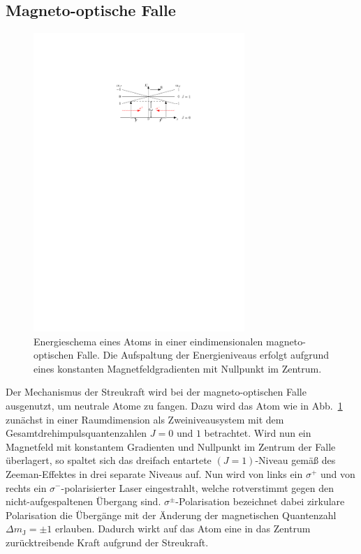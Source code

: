 \documentclass[twocolumn]{revtex4}
\begin{document}
\subsection{Magneto-optische Falle}
\begin{figure}[t]
	\centering
	\vspace{0.4cm}
	\includegraphics[width=80mm]{./figures/mot_gesamt_resize.pdf}
	\caption{Energieschema eines Atoms in einer eindimensionalen magneto-optischen Falle. Die Aufspaltung der Energieniveaus erfolgt aufgrund eines konstanten Magnetfeldgradienten mit Nullpunkt im Zentrum.}
	\label{fig:mot}
\end{figure}
Der Mechanismus der Streukraft wird bei der magneto-optischen Falle ausgenutzt, um neutrale Atome zu fangen.
Dazu wird das Atom wie in Abb.~\ref{fig:mot} zunächst in einer Raumdimension als Zweiniveausystem mit dem Gesamtdrehimpulsquantenzahlen $J=0$ und $1$ betrachtet.
Wird nun ein Magnetfeld mit konstantem Gradienten und Nullpunkt im Zentrum der Falle überlagert, so spaltet sich das dreifach entartete $(J=1)$-Niveau gemäß des Zeeman-Effektes in drei separate Niveaus auf.
Nun wird von links ein $\sigma^+$ und von rechts ein $\sigma^-$-polarisierter Laser eingestrahlt, welche rotverstimmt gegen den nicht-aufgespaltenen Übergang sind.
$\sigma^\pm$-Polarisation bezeichnet dabei zirkulare Polarisation die Übergänge mit der Änderung der magnetischen Quantenzahl $\Delta m_\mathrm{J} = \pm 1$ erlauben.
Dadurch wirkt auf das Atom eine in das Zentrum zurücktreibende Kraft aufgrund der Streukraft.
\end{document}
